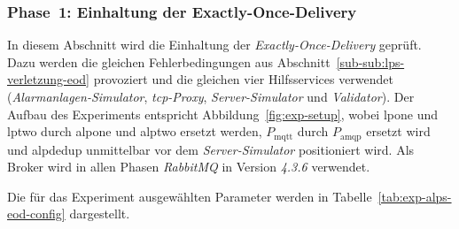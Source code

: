 \subsubsection{Phase~1: Einhaltung der Exactly-Once-Delivery}
\label{sub-sub:exp-alps-phase-1}

In diesem Abschnitt wird die Einhaltung der \textit{Exactly-Once-Delivery} geprüft. Dazu werden die gleichen Fehlerbedingungen aus Abschnitt~\ref{sub-sub:lps-verletzung-eod} provoziert und die gleichen vier Hilfsservices verwendet (\textit{Alarmanlagen-Simulator}, \textit{\gls{tcp}-Proxy}, \textit{Server-Simulator} und \textit{Validator}). Der Aufbau des Experiments entspricht Abbildung~\ref{fig:exp-setup}, wobei \gls{lpone} und \gls{lptwo} durch \gls{alpone} und \gls{alptwo} ersetzt werden, $P_{\text{mqtt}}$ durch $P_{\text{amqp}}$ ersetzt wird und \gls{alpdedup} unmittelbar vor dem \textit{Server-Simulator} positioniert wird. Als Broker wird in allen Phasen \textit{RabbitMQ} in Version \textit{4.3.6} verwendet.

Die für das Experiment ausgewählten Parameter werden in Tabelle~\ref{tab:exp-alps-eod-config} dargestellt.

